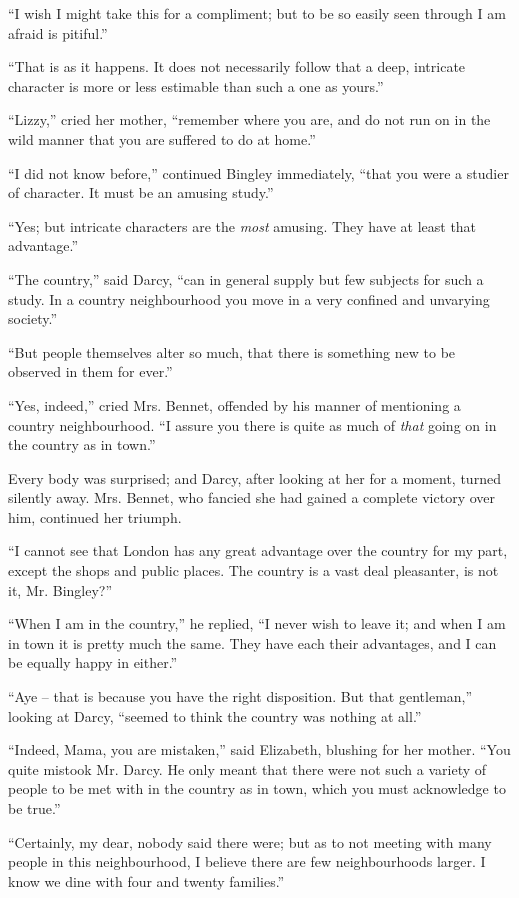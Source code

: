 “I wish I might take this for a compliment; but to
be so easily seen through I am afraid is pitiful.”

“That is as it happens. It does not necessarily follow
that a deep, intricate character is more or less estimable
than such a one as yours.”

“Lizzy,” cried her mother, “remember where you are,
and do not run on in the wild manner that you are suffered
to do at home.”

“I did not know before,” continued Bingley immediately,
“that you were a studier of character. It must be
an amusing study.”

“Yes; but intricate characters are the \textit{most} amusing.
They have at least that advantage.”

“The country,” said Darcy, “can in general supply but
few subjects for such a study. In a country
neighbourhood you move in a very confined and unvarying
society.”

“But people themselves alter so much, that there is
something new to be observed in them for ever.”

“Yes, indeed,” cried Mrs. Bennet, offended by his
manner of mentioning a country neighbourhood. “I
assure you there is quite as much of \textit{that} going on in the
country as in town.”

Every body was surprised; and Darcy, after looking
at her for a moment, turned silently away. Mrs. Bennet,
who fancied she had gained a complete victory over him,
continued her triumph.

“I cannot see that London has any great advantage
over the country for my part, except the shops and public
places. The country is a vast deal pleasanter, is not it,
Mr. Bingley?”

“When I am in the country,” he replied, “I never
wish to leave it; and when I am in town it is pretty much
the same. They have each their advantages, and I can
be equally happy in either.”

“Aye -- that is because you have the right disposition.
But that gentleman,” looking at Darcy, “seemed to think
the country was nothing at all.”

“Indeed, Mama, you are mistaken,” said Elizabeth,
blushing for her mother. “You quite mistook Mr. Darcy.
He only meant that there were not such a variety of people
to be met with in the country as in town, which you must
acknowledge to be true.”

“Certainly, my dear, nobody said there were; but as
to not meeting with many people in this neighbourhood,
I believe there are few neighbourhoods larger. I know
we dine with four and twenty families.”

